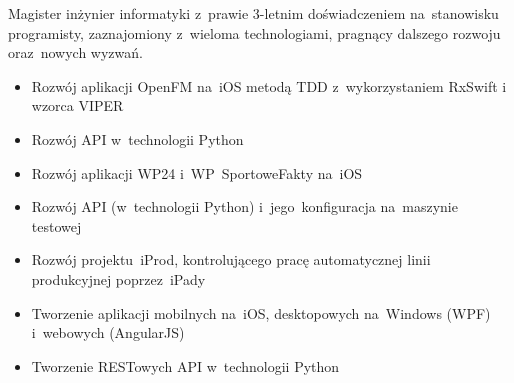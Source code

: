 \documentclass[11pt,a4paper]{article}
\begin{document}
    \bigskip

  
    \smallskip

    \noindent
    Magister inżynier informatyki z~prawie 3-letnim doświadczeniem na~stanowisku programisty, zaznajomiony z~wieloma
    technologiami, pragnący dalszego rozwoju oraz~nowych wyzwań.
  

    \bigskip


    \smallskip

    \vspace{-0.2cm}
    \begin{itemize} \itemsep1pt \parskip0pt 
        \item Rozwój aplikacji OpenFM na~iOS metodą TDD z~wykorzystaniem RxSwift i wzorca VIPER
        \item Rozwój API w~technologii Python
    \end{itemize}
    \vspace{-0.2cm}
    \vspace{-0.2cm}
    \begin{itemize} \itemsep1pt \parskip0pt 
        \item Rozwój aplikacji WP24 i~WP~SportoweFakty na~iOS
        \item Rozwój API (w~technologii Python) i~jego~konfiguracja na~maszynie testowej
    \end{itemize}
    \vspace{-0.2cm}
    \vspace{-0.2cm}
    \begin{itemize} \itemsep1pt \parskip0pt 
        \item Rozwój projektu~iProd, kontrolującego pracę automatycznej linii produkcyjnej poprzez~iPady
        \item Tworzenie aplikacji mobilnych na~iOS, desktopowych na~Windows (WPF) i~webowych (AngularJS)
        \item Tworzenie RESTowych API w~technologii Python
    \end{itemize}
\end{document}
